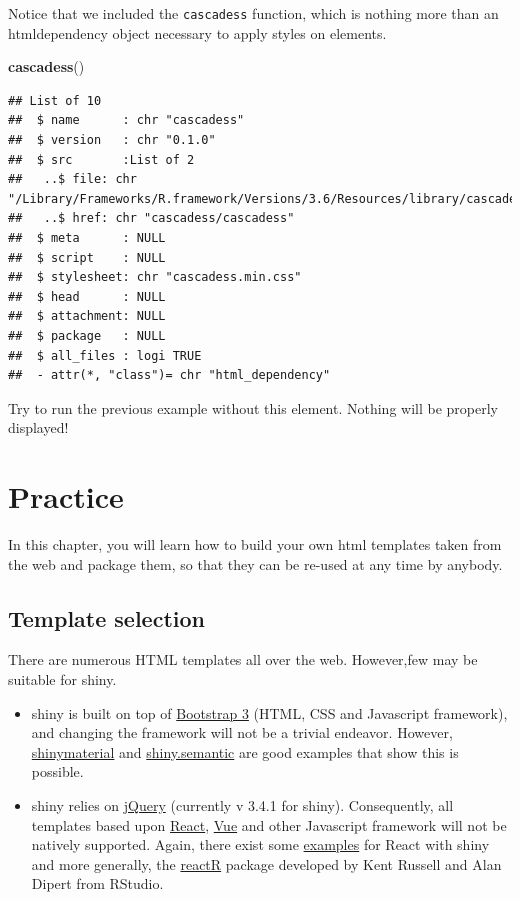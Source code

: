\documentclass[
]{book}
\newenvironment{Shaded}{\begin{snugshade}}{\end{snugshade}}
\newcommand{\KeywordTok}[1]{\textcolor[rgb]{0.13,0.29,0.53}{\textbf{#1}}}
\newcommand{\NormalTok}[1]{#1}
\providecommand{\tightlist}{%
  \setlength{\itemsep}{0pt}\setlength{\parskip}{0pt}}
\begin{document}
Notice that we included the \texttt{cascadess} function, which is nothing more than an htmldependency object necessary to apply styles on elements.

\begin{Shaded}
\begin{Highlighting}[]
\KeywordTok{cascadess}\NormalTok{()}
\end{Highlighting}
\end{Shaded}

\begin{verbatim}
## List of 10
##  $ name      : chr "cascadess"
##  $ version   : chr "0.1.0"
##  $ src       :List of 2
##   ..$ file: chr "/Library/Frameworks/R.framework/Versions/3.6/Resources/library/cascadess/www/cascadess"
##   ..$ href: chr "cascadess/cascadess"
##  $ meta      : NULL
##  $ script    : NULL
##  $ stylesheet: chr "cascadess.min.css"
##  $ head      : NULL
##  $ attachment: NULL
##  $ package   : NULL
##  $ all_files : logi TRUE
##  - attr(*, "class")= chr "html_dependency"
\end{verbatim}

Try to run the previous example without this element. Nothing will be properly displayed!

\hypertarget{part-practice}{%
\part*{Practice}\label{part-practice}}

In this chapter, you will learn how to build your own html templates taken from the web and package them, so that they can be re-used at any time by anybody.

\hypertarget{custom-templates-selection}{%
\chapter{Template selection}\label{custom-templates-selection}}

There are numerous HTML templates all over the web. However,few may be suitable for shiny.

\begin{itemize}
\tightlist
\item
  shiny is built on top of \href{https://getbootstrap.com/docs/3.3/}{Bootstrap 3} (HTML, CSS and Javascript framework), and changing the framework will not be a trivial endeavor. However, \href{https://github.com/ericrayanderson/shinymaterial}{shinymaterial} and \href{https://github.com/Appsilon/shiny.semantic}{shiny.semantic} are good examples that show this is possible.
\item
  shiny relies on \href{https://jquery.com}{jQuery} (currently v 3.4.1 for shiny). Consequently, all templates based upon \href{https://fr.reactjs.org}{React}, \href{https://vuejs.org}{Vue} and other Javascript framework will not be natively supported. Again, there exist some \href{https://github.com/alandipert/react-widget-demo/blob/master/app.R}{examples} for React with shiny and more generally,
  the \href{https://react-r.github.io/reactR/}{reactR} package developed by Kent Russell and Alan Dipert from RStudio.
\end{itemize}
\end{document}

